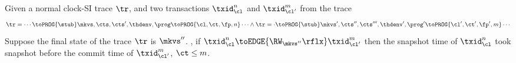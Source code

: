 \begin{lemma}[\( \RW_\mkvs \)]
    \label{lem:clock-si-rw}
    Given a normal clock-SI trace \( \tr \), and two transactions \( \txid_\cl^n \) and \( \txid_{\cl'}^m \) from the trace
    \[
        \begin{array}{@{}l@{}}
            \tr = \cdots \toPROG{\stub} \mkvs,\cts,\cts',\thdenv, \prog \toPROG{\cl,\ct,\fp,n} \cdots \land 
            \tr = \cdot \toPROG{\stub} \mkvs',\cts'',\cts''',\thdenv', \prog' \toPROG{\cl',\ct',\fp',m} \cdots
        \end{array}
    \]
    Suppose the final state of the trace \( \tr \) is \( \mkvs'' \).
    , if \( \txid_\cl^n \toEDGE{\RW_{\mkvs''}\rflx} \txid_{\cl'}^m \) then the snapshot time of \( \txid_{\cl}^n \) took snapshot before the commit time of \( \txid_{\cl'}^m \), \ie \( \ct \leq m \).
\end{lemma}
